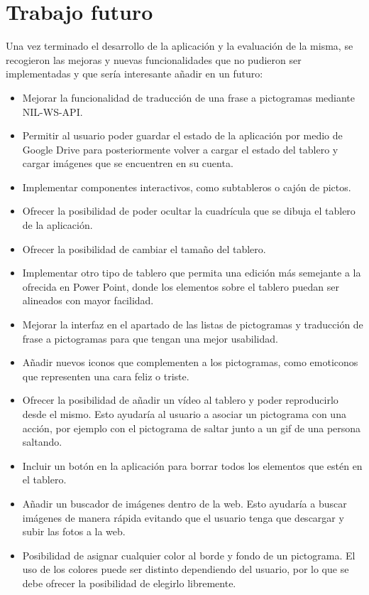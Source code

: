 \section{Trabajo futuro}
\label{cap7:sec:trabajofuturo}
Una vez terminado el desarrollo de la aplicación y la evaluación de la misma, se recogieron las mejoras y nuevas funcionalidades que no pudieron ser implementadas y que sería interesante añadir en un futuro: 

\begin{itemize}
	\item Mejorar la funcionalidad de traducción de una frase a pictogramas mediante NIL-WS-API.
	\item Permitir al usuario poder guardar el estado de la aplicación por medio de Google Drive para posteriormente volver a cargar el estado del tablero y cargar imágenes que se encuentren en su cuenta.
	
	\item Implementar componentes interactivos, como subtableros o cajón de pictos.
	
	\item Ofrecer la posibilidad de poder ocultar la cuadrícula que se dibuja el tablero de la aplicación.
	\item Ofrecer la posibilidad de cambiar el tamaño del tablero.
	
	\item Implementar otro tipo de tablero que permita una edición más semejante a la ofrecida en Power Point, donde los elementos sobre el tablero puedan ser alineados con mayor facilidad.  
	\item Mejorar la interfaz en el apartado de las listas de pictogramas y traducción de frase a pictogramas para que tengan una mejor usabilidad.
	
	\item Añadir nuevos iconos que complementen a los pictogramas, como emoticonos que representen una cara feliz o triste.
	
	\item Ofrecer la posibilidad de añadir un vídeo al tablero y poder reproducirlo desde el mismo. Esto ayudaría al usuario a asociar un pictograma con una acción, por ejemplo con el pictograma de saltar junto a un gif de una persona saltando.
	
	\item Incluir un botón en la aplicación para borrar todos los elementos que estén en el tablero.
	
	\item Añadir un buscador de imágenes dentro de la web. Esto ayudaría a buscar imágenes de manera rápida evitando que el usuario tenga que descargar y subir las fotos a la web. 
	
	\item Posibilidad de asignar cualquier color al borde y fondo de un pictograma. El uso de los colores puede ser distinto dependiendo del usuario, por lo que se debe ofrecer la posibilidad de elegirlo libremente. 
	
\end{itemize}








